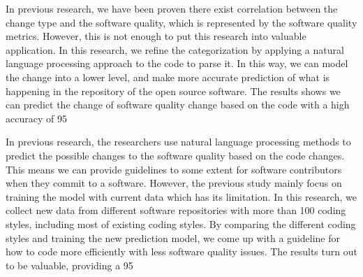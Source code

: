 In previous research, we have been proven there exist correlation between the change type and the software quality, which is represented by the software quality metrics. However, this is not enough to put this research into valuable application. In this research, we refine the categorization by applying a natural language processing approach to the code to parse it. In this way, we can model the change into a lower level, and make more accurate prediction of what is happening in the repository of the open source software. The results shows we can predict the change of software quality change based on the code with a high accuracy of 95%

In previous research, the researchers use natural language processing methods to predict the possible changes to the software quality based on the code changes. This means we can provide guidelines to some extent for software contributors when they commit to a software. However, the previous study mainly focus on training the model with current data which has its limitation. In this research, we collect new data from different software repositories with more than 100 coding styles, including most of existing coding styles. By comparing the different coding styles and training the new prediction model, we come up with a guideline for how to code more efficiently with less software quality issues. The results turn out to be valuable, providing a 95%
